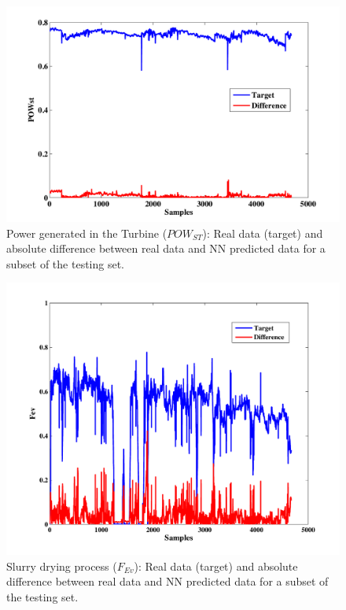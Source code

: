 \begin{figure}
\centering
\includegraphics[width=1\textwidth]{figures/POWst.pdf}
\caption{Power generated in the Turbine ($POW_{ST}$): Real data (target) and absolute difference between real data and NN predicted data for a subset of the testing set.}
\label{Pturbine}
\end{figure}

\begin{figure}
\centering
\includegraphics[width=1\textwidth]{figures/Fev.pdf}
\caption{Slurry drying process ($F_{Ev}$): Real data (target) and absolute difference between real data and NN predicted data for a subset of the testing set.}
\label{PEvaporator}
\end{figure}

